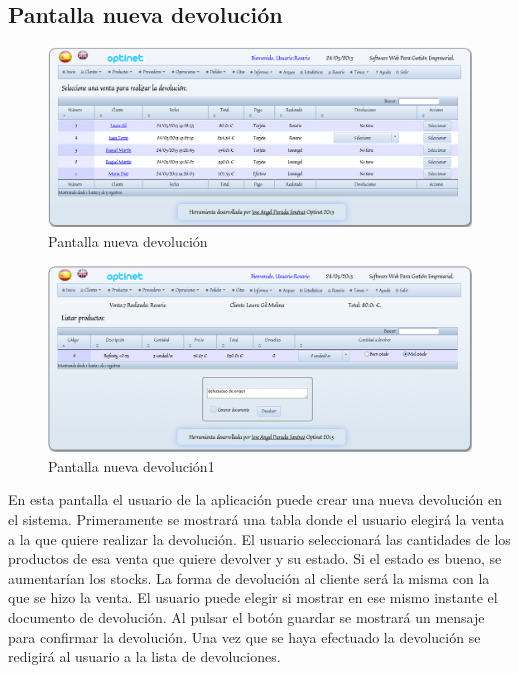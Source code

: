 \documentclass[a4paper,11pt]{book}
\begin{document}
\newpage
\subsection {Pantalla nueva devolución}

\begin{figure}[!htb]
  \centering
    \includegraphics[scale=0.35]{capnuevadevolucion.png}
  \caption{Pantalla nueva devolución}
  \label{a}
\end{figure}

\begin{figure}[!htb]
  \centering
    \includegraphics[scale=0.35]{capnuevadevolucion1.png}
  \caption{Pantalla nueva devolución1}
  \label{a}
\end{figure}

En esta pantalla el usuario de la aplicación puede crear una nueva devolución en el sistema. Primeramente se mostrará una tabla donde el usuario elegirá la venta a la que quiere realizar la devolución. El usuario seleccionará las cantidades de los productos de esa venta que quiere devolver y su estado. Si el estado es bueno, se aumentarían los stocks. La forma de devolución al cliente será la misma con la que se hizo la venta. El usuario puede elegir si mostrar en ese mismo instante el documento de devolución. Al pulsar el botón guardar se mostrará un mensaje para confirmar la devolución. Una vez que se haya efectuado la devolución se redigirá al usuario a la lista de devoluciones.
\end{document}
